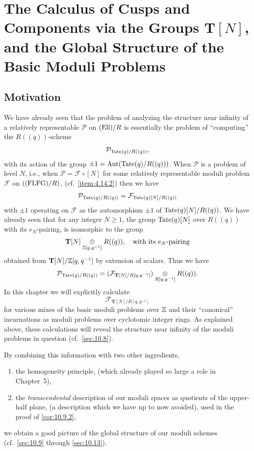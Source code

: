 \chapter{The Calculus of Cusps and Components via the Groups $\mathbf{T}[N]$, and the Global Structure of the Basic Moduli Problems}
\label{ch:10}

\section{Motivation}
\label{sec:10.1}

We have already seen that the problem of analyzing the structure near infinity of a relatively representable $\mathcal{P}$ on $(\mathrm{Ell})/R$ is essentially the problem of ``computing'' the $R((q))$-scheme
\[
\mathcal{P}_{\mathrm{Tate}(q)/R((q))} ,
\]
with its action of the group $\pm 1 = \operatorname{Aut}(\mathrm{Tate}(q)/R((q)))$.
When $\mathcal{P}$ is a problem of level $N$, i.e., when $\mathcal{P} = \mathcal{F} \circ [N]$ for some relatively representable moduli problem $\mathcal{F}$ on $((\mathrm{FLFG})/R)$, (cf.~\ref{item:4.14.2}) then we have
\[
\mathcal{P}_{\mathrm{Tate}(q)/R((q))} = \mathcal{F}_{\mathrm{Tate}(q)[N]/R((q))}
\]
with $\pm 1$ operating on $\mathcal{F}$ as the automorphism $\pm 1$ of $\mathrm{Tate}(q)[N]/\allowbreak R((q))$.
We have already seen that for any integer $N \ge 1$, the group $\mathrm{Tate}(q)[N]$ over $R((q))$ with its $e_N$-pairing, is isomorphic to the group
\[
\mathbf{T}[N] \underset{\mathbb{Z}[q,q^{-1}]}{\otimes} R((q)) , \quad \text{with its } e_N\text{-pairing}
\]
obtained from $\mathbf{T}[N]/\mathbb{Z}[q,q^{-1}]$ by extension of scalars. Thus we have
\[
\mathcal{P}_{\mathrm{Tate}(q)/R((q))} = (\mathcal{F}_{\mathbf{T}[N]/R[q,q^{-1}]}) \underset{R[q,q^{-1}]}{\otimes} R((q)) .
\]
In this chapter we will explicitly calculate
\[
\mathcal{F}_{\mathbf{T}[N]/R[q,q^{-1}]}
\]
for various mixes of the basic moduli problems over $\mathbb{Z}$ and their ``canonical'' incarnations as moduli problems over cyclotomic integer rings. As explained above, these calculations will reveal the structure near infinity of the moduli problems in question (cf.~\ref{sec:10.8}).

By combining this information with two other ingredients,
\begin{enumerate}[label=(\arabic*)]
\item the homogeneity principle, (which already played so large a role in Chapter~5),
\item the \emph{transcendental} description of our moduli spaces as quotients of the upper-half plane, (a description which we have up to now avoided), used in the proof of \ref{cor:10.9.2},
\end{enumerate}
we obtain a good picture of the global structure of our moduli schemes (cf.~\ref{sec:10.9} through \ref{sec:10.13}).

